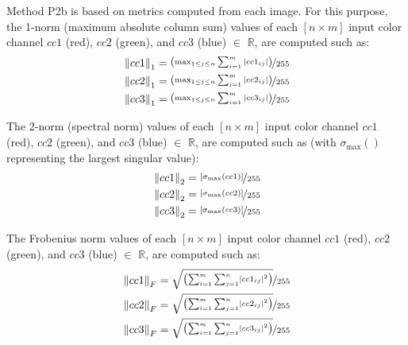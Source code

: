 \documentclass[superscriptaddress,longbibliography,aps,prl,twocolumn,10pt]{revtex4-2}
\newcommand{\norm}[1]{\left\lVert#1\right\rVert}
\begin{document}
Method P2b is based on metrics computed from each image. For this purpose, the 1-norm (maximum absolute column sum) values of each $[n \times m]$ input color channel $cc1$ (red), $cc2$ (green), and $cc3$ (blue) $\in$ $\mathbb{R}$, are computed such as: 
    \begin{equation} \label{eq:1-norm}
    \begin{aligned}
        &\norm{cc1}_{1} = \nicefrac{\left( \max_{1 \leq j \leq n} \sum_{i=1}^m |cc1_{ij}| \right)}{255} \\ 
        &\norm{cc2}_{1} = \nicefrac{\left( \max_{1 \leq j \leq n} \sum_{i=1}^m |cc2_{ij}| \right)}{255} \\
        &\norm{cc3}_{1} = \nicefrac{\left( \max_{1 \leq j \leq n} \sum_{i=1}^m |cc3_{ij}| \right)}{255}
    \end{aligned}
    \end{equation}
    
\noindent
The 2-norm (spectral norm) values of each $[n \times m]$ input color channel $cc1$ (red), $cc2$ (green), and $cc3$ (blue) $\in$ $\mathbb{R}$, are computed such as (with $\sigma_{\text{max}}()$ representing the largest singular value): 
    \begin{equation} \label{eq:2-norm}
    \begin{aligned}
        &\norm{cc1}_{2} = \nicefrac{\left[ \sigma_{\text{max}}(cc1) \right]}{255} \\ 
        &\norm{cc2}_{2} = \nicefrac{\left[ \sigma_{\text{max}}(cc2) \right]}{255} \\
        &\norm{cc3}_{2} = \nicefrac{\left[ \sigma_{\text{max}}(cc3) \right]}{255}
    \end{aligned}
    \end{equation}

\noindent
The Frobenius norm \cite{Golub1996} values of each $[n \times m]$ input color channel $cc1$ (red), $cc2$ (green), and $cc3$ (blue) $\in$ $\mathbb{R}$, are computed such as: 
    \begin{equation} \label{eq:frobeniusnorm}
    \begin{aligned}
        &\norm{cc1}_{F} = \nicefrac{\sqrt{\left( \sum_{i=1}^{m} \sum_{j=1}^{n} \left| cc1_{ij} \right|^2 \right)}}{255} \\ 
        &\norm{cc2}_{F} = \nicefrac{\sqrt{\left( \sum_{i=1}^{m} \sum_{j=1}^{n} \left| cc2_{ij} \right|^2 \right)}}{255} \\ 
        &\norm{cc3}_{F} = \nicefrac{\sqrt{\left( \sum_{i=1}^{m} \sum_{j=1}^{n} \left| cc3_{ij} \right|^2 \right)}}{255}
    \end{aligned}
    \end{equation}
\end{document}
